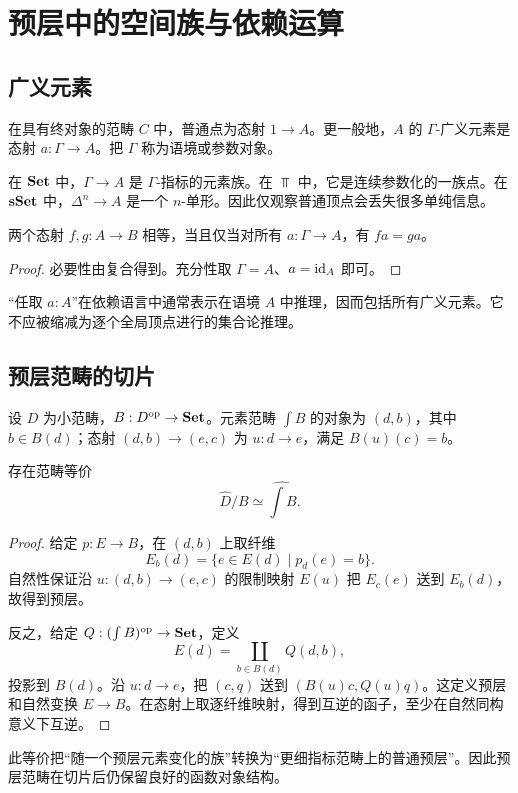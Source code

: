 \chapter{预层中的空间族与依赖运算}
\section{广义元素}
\begin{definition}[广义元素]
在具有终对象的范畴 $C$ 中，普通点为态射 $1\to A$。更一般地，$A$ 的 $\Gamma$-广义元素是态射 $a:\Gamma\to A$。把 $\Gamma$ 称为语境或参数对象。
\end{definition}
\begin{example}
在 $\mathbf{Set}$ 中，$\Gamma\to A$ 是 $\Gamma$-指标的元素族。在 $\Top$ 中，它是连续参数化的一族点。在 $\mathbf{sSet}$ 中，$\Delta^n\to A$ 是一个 $n$-单形。因此仅观察普通顶点会丢失很多单纯信息。
\end{example}
\begin{proposition}[广义元素辨别态射]
两个态射 $f,g:A\to B$ 相等，当且仅当对所有 $a:\Gamma\to A$，有 $fa=ga$。
\end{proposition}
\begin{proof}
必要性由复合得到。充分性取 $\Gamma=A$、$a=\operatorname{id}_A$ 即可。
\end{proof}
\begin{remark}
“任取 $a:A$”在依赖语言中通常表示在语境 $A$ 中推理，因而包括所有广义元素。它不应被缩减为逐个全局顶点进行的集合论推理。
\end{remark}

\section{预层范畴的切片}
\begin{definition}[预层的元素范畴]
设 $D$ 为小范畴，$B:D^{\mathrm{op}}\to\mathbf{Set}$。元素范畴 $\int B$ 的对象为 $(d,b)$，其中 $b\in B(d)$；态射 $(d,b)\to(e,c)$ 为 $u:d\to e$，满足 $B(u)(c)=b$。
\end{definition}
\begin{proposition}[切片仍是预层范畴]
存在范畴等价
\[
\widehat D/B\simeq\widehat{\int B}.
\]
\end{proposition}
\begin{proof}
给定 $p:E\to B$，在 $(d,b)$ 上取纤维
\[
E_b(d)=\{e\in E(d)\mid p_d(e)=b\}.
\]
自然性保证沿 $u:(d,b)\to(e,c)$ 的限制映射 $E(u)$ 把 $E_c(e)$ 送到 $E_b(d)$，故得到预层。

反之，给定 $Q:(\int B)^{\mathrm{op}}\to\mathbf{Set}$，定义
\[
E(d)=\coprod_{b\in B(d)}Q(d,b),
\]
投影到 $B(d)$。沿 $u:d\to e$，把 $(c,q)$ 送到 $(B(u)c,Q(u)q)$。这定义预层和自然变换 $E\to B$。在态射上取逐纤维映射，得到互逆的函子，至少在自然同构意义下互逆。
\end{proof}
\begin{remark}
此等价把“随一个预层元素变化的族”转换为“更细指标范畴上的普通预层”。因此预层范畴在切片后仍保留良好的函数对象结构。
\end{remark}

